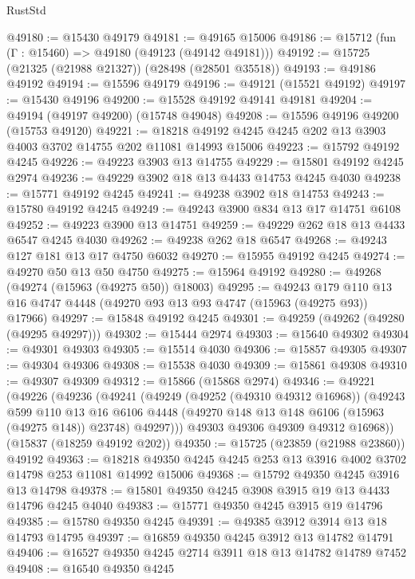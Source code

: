 \begin{lexlean}{RustStd}
\begin{coremodule}
{\begin{coremodule}
{{{{{{{{{{{{{{{{{{{{{{{{{{{{{{{{{{{{{{{{{{{{{{{{{{{{{{{{{{{{@49180 := @15430 @49179
@49181 := @49165 @15006
@49186 := @15712 (fun (Γ : @15460) => @49180 (@49123 (@49142 @49181)))
@49192 := @15725 (@21325 (@21988 @21327)) (@28498 (@28501 @35518))
@49193 := @49186 @49192
@49194 := @15596 @49179
@49196 := @49121 (@15521 @49192)
@49197 := @15430 @49196
@49200 := @15528 @49192 @49141 @49181
@49204 := @49194 (@49197 @49200) (@15748 @49048)
@49208 := @15596 @49196 @49200 (@15753 @49120)
@49221 := @18218 @49192 @4245 @4245 @202 @13 @3903 @4003 @3702 @14755 @202 @11081 @14993 @15006
@49223 := @15792 @49192 @4245
@49226 := @49223 @3903 @13 @14755
@49229 := @15801 @49192 @4245 @2974
@49236 := @49229 @3902 @18 @13 @4433 @14753 @4245 @4030
@49238 := @15771 @49192 @4245
@49241 := @49238 @3902 @18 @14753
@49243 := @15780 @49192 @4245
@49249 := @49243 @3900 @834 @13 @17 @14751 @6108
@49252 := @49223 @3900 @13 @14751
@49259 := @49229 @262 @18 @13 @4433 @6547 @4245 @4030
@49262 := @49238 @262 @18 @6547
@49268 := @49243 @127 @181 @13 @17 @4750 @6032
@49270 := @15955 @49192 @4245
@49274 := @49270 @50 @13 @50 @4750
@49275 := @15964 @49192
@49280 := @49268 (@49274 (@15963 (@49275 @50)) @18003)
@49295 := @49243
    @179
    @110
    @13
    @16
    @4747
    @4448
    (@49270 @93 @13 @93 @4747 (@15963 (@49275 @93)) @17966)
@49297 := @15848 @49192 @4245
@49301 := @49259 (@49262 (@49280 (@49295 @49297)))
@49302 := @15444 @2974
@49303 := @15640 @49302
@49304 := @49301 @49303
@49305 := @15514 @4030
@49306 := @15857 @49305
@49307 := @49304 @49306
@49308 := @15538 @4030
@49309 := @15861 @49308
@49310 := @49307 @49309
@49312 := @15866 (@15868 @2974)
@49346 := @49221
    (@49226
      (@49236
        (@49241
          (@49249
            (@49252 (@49310 @49312 @16968))
            (@49243
              @599
              @110
              @13
              @16
              @6106
              @4448
              (@49270 @148 @13 @148 @6106 (@15963 (@49275 @148)) @23748)
              @49297)))
        @49303
        @49306
        @49309
        @49312
        @16968))
    (@15837 (@18259 @49192 @202))
@49350 := @15725 (@23859 (@21988 @23860)) @49192
@49363 := @18218 @49350 @4245 @4245 @253 @13 @3916 @4002 @3702 @14798 @253 @11081 @14992 @15006
@49368 := @15792 @49350 @4245 @3916 @13 @14798
@49378 := @15801 @49350 @4245 @3908 @3915 @19 @13 @4433 @14796 @4245 @4040
@49383 := @15771 @49350 @4245 @3915 @19 @14796
@49385 := @15780 @49350 @4245
@49391 := @49385 @3912 @3914 @13 @18 @14793 @14795
@49397 := @16859 @49350 @4245 @3912 @13 @14782 @14791
@49406 := @16527 @49350 @4245 @2714 @3911 @18 @13 @14782 @14789 @7452
@49408 := @16540 @49350 @4245
}}}}}}}}}}}}}}}}}}}}}}}}}}}}}}}}}}}}}}}}}}}}}}}}}}}}}}}}}}}}
\end{coremodule}}
\end{coremodule}
\end{lexlean}
